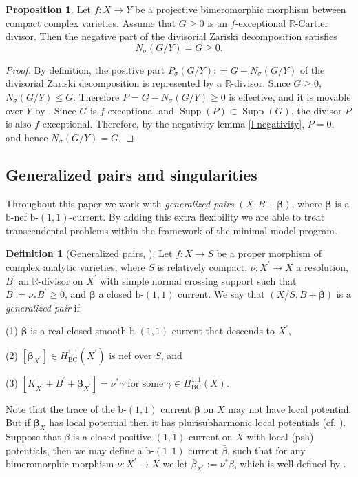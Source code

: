 \documentclass[11pt]{amsart}
\numberwithin{equation}{section}
\def\bbeta{\boldsymbol{\beta}}
\theoremstyle{definition}
\theoremstyle{definition}
\newtheorem{proposition}[theorem]{Proposition}
\theoremstyle{definition}
\newtheorem{definition}[theorem]{Definition}
\begin{document}
\begin{proposition}\label{p-negZariski}
Let $f:X\to Y$ be a projective bimeromorphic morphism between compact complex varieties. Assume that $G\ge 0$ is an $f$-exceptional $\mathbb{R}$-Cartier divisor. Then the negative part of the divisorial Zariski decomposition satisfies $$N_{\sigma}(G/Y) = G \ge 0.$$
\end{proposition}
\begin{proof}
By definition, the positive part $P_\sigma(G/Y): = G - N_{\sigma}(G/Y)$ of the
divisorial Zariski decomposition is represented by a
$\mathbb{R}$-divisor. Since $G \ge 0$, $N_{\sigma}(G/Y) \le G$. Therefore $P = G - N_{\sigma}(G/Y) \ge 0$
is effective, and it is movable over $Y$ by
\cite[Lemma 4.10]{FKL16}. Since $G$ is $f$-exceptional and $\operatorname{Supp}(P) \subset
\operatorname{Supp}(G)$, the divisor $P$ is also $f$-exceptional.
Therefore, by the negativity lemma \ref{l-negativity}, $P = 0$, and hence
$N_{\sigma}(G/Y) = G$.
\end{proof}

\subsection{Generalized pairs and singularities}
Throughout this paper we work with \emph{generalized pairs} 
$(X,B+\bbeta )$, where $\bbeta$ is a b-nef b-$(1,1)$-current. By adding this extra flexibility we are able to treat transcendental problems within the framework of the minimal model
program.
\begin{definition}[{Generalized pairs, \cite[Definition 2.7]{DHY23}}]
Let $f: X \rightarrow S$ be a proper morphism of complex analytic varieties, where $S$ is relatively compact, $\nu: X^{\prime} \rightarrow X$ a resolution, $B^{\prime}$ an $\mathbb{R}$-divisor on $X^{\prime}$ with simple normal crossing support such that $B:=\nu_* B^{\prime} \geq 0$, and $\boldsymbol{\beta}$ a closed $\mathrm{b}$-$(1,1)$ current. We say that $(X/S, B+\boldsymbol{\beta})$ is a \textit{generalized pair} if

(1) $\boldsymbol{\beta}$ is a real closed smooth b-$(1,1)$ current that descends to $X^{\prime}$,

(2) $\left[\boldsymbol{\beta}_{X^{\prime}}\right] \in H_{\mathrm{BC}}^{1,1}\left(X^{\prime}\right)$ is nef over $S$, and

(3) $\left[K_{X^{\prime}}+B^{\prime}+\boldsymbol{\beta}_{X^{\prime}}\right]=\nu^* \gamma$ for some $\gamma \in H_{\mathrm{BC}}^{1,1}(X)$.
\end{definition}
Note that the trace of the b-$(1,1)$ current $\bbeta$ on $X$ may not have local potential. But if $\bbeta_{X}$ has local potential then it has plurisubharmonic local potentials (cf. \cite[Remark 2.6.(ii)]{DHY23}). Suppose that $\beta$ is a closed positive $(1,1)$-current on $X$ with local (psh) potentials, then we may define a b-$(1,1)$ current $\bar{\beta}$, such that for any bimeromorphic morphism $\nu: X^{\prime} \rightarrow X$ we let $\bar{\beta}_{X^{\prime}}:=\nu^* \beta$, which is well defined by \cite[Claim 2.5]{DHY23}. 
\end{document}
